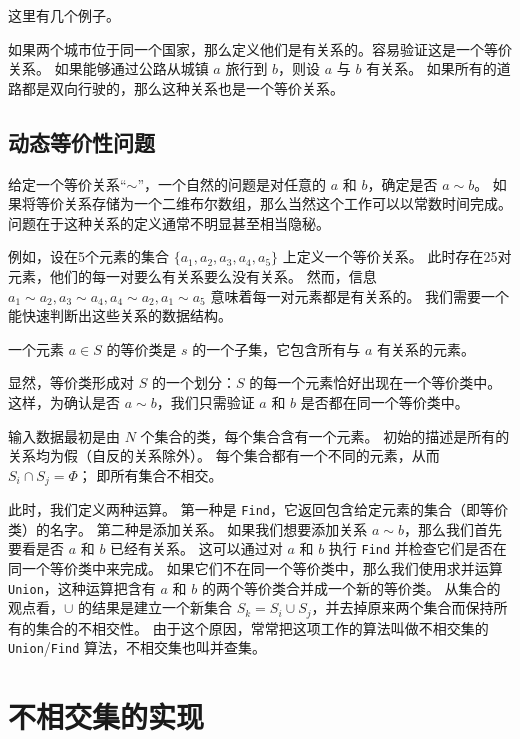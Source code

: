 \documentclass[withoutpreface,bwprint]{cumcmthesis}
\begin{document}
这里有几个例子。

如果两个城市位于同一个国家，那么定义他们是有关系的。容易验证这是一个等价关系。
如果能够通过公路从城镇 $a$ 旅行到 $b$，则设 $a$ 与 $b$ 有关系。
如果所有的道路都是双向行驶的，那么这种关系也是一个等价关系。

\subsection{动态等价性问题}

给定一个等价关系“$\sim$”，一个自然的问题是对任意的 $a$ 和 $b$，确定是否 $a\sim{}b$。
如果将等价关系存储为一个二维布尔数组，那么当然这个工作可以以常数时间完成。
问题在于这种关系的定义通常不明显甚至相当隐秘。

例如，设在5个元素的集合 $\{a_1,a_2,a_3,a_4,a_5\}$ 上定义一个等价关系。
此时存在25对元素，他们的每一对要么有关系要么没有关系。
然而，信息 $a_1\sim{}a_2, a_3\sim{}a_4, a_4\sim{}a_2, a_1\sim{}a_5$ 意味着每一对元素都是有关系的。
我们需要一个能快速判断出这些关系的数据结构。

\begin{definition}[等价类]
一个元素 $a\in{}S$ 的等价类是 $s$ 的一个子集，它包含所有与 $a$ 有关系的元素。
\end{definition}

显然，等价类形成对 $S$ 的一个划分：$S$ 的每一个元素恰好出现在一个等价类中。
这样，为确认是否 $a\sim{}b$，我们只需验证 $a$ 和 $b$ 是否都在同一个等价类中。

输入数据最初是由 $N$ 个集合的类，每个集合含有一个元素。
初始的描述是所有的关系均为假（自反的关系除外）。
每个集合都有一个不同的元素，从而 $S_i\cap{}S_j = \varPhi$；
即所有集合不相交。

此时，我们定义两种运算。
第一种是 \verb|Find|，它返回包含给定元素的集合（即等价类）的名字。
第二种是添加关系。
如果我们想要添加关系 $a\sim{}b$，那么我们首先要看是否 $a$ 和 $b$ 已经有关系。
这可以通过对 $a$ 和 $b$ 执行 \verb|Find| 并检查它们是否在同一个等价类中来完成。
如果它们不在同一个等价类中，那么我们使用求并运算 \verb|Union|，这种运算把含有 $a$ 和 $b$ 的两个等价类合并成一个新的等价类。
从集合的观点看，$\cup$ 的结果是建立一个新集合 $S_k = S_i \cup S_j$，并去掉原来两个集合而保持所有的集合的不相交性。
由于这个原因，常常把这项工作的算法叫做不相交集的 \verb|Union|/\verb|Find| 算法，不相交集也叫并查集。

\section{不相交集的实现}
\end{document}
